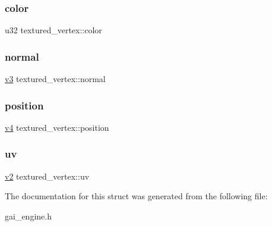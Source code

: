 \subsubsection{\texorpdfstring{color}{color}}
{\footnotesize\ttfamily u32 textured\+\_\+vertex\+::color}

\mbox{\label{structtextured__vertex_a0d7951149447a90843f0474a1f5601ff}} 
\subsubsection{\texorpdfstring{normal}{normal}}
{\footnotesize\ttfamily \hyperlink{unionv3}{v3} textured\+\_\+vertex\+::normal}

\mbox{\label{structtextured__vertex_a3c4cd89155276901e97abbea671a5dc3}} 
\subsubsection{\texorpdfstring{position}{position}}
{\footnotesize\ttfamily \hyperlink{unionv4}{v4} textured\+\_\+vertex\+::position}

\mbox{\label{structtextured__vertex_a4301365e41e35082f64868b6ee5193ff}} 
\subsubsection{\texorpdfstring{uv}{uv}}
{\footnotesize\ttfamily \hyperlink{unionv2}{v2} textured\+\_\+vertex\+::uv}



The documentation for this struct was generated from the following file\+:\begin{DoxyCompactItemize}
\item 
gai\+\_\+engine.\+h\end{DoxyCompactItemize}
